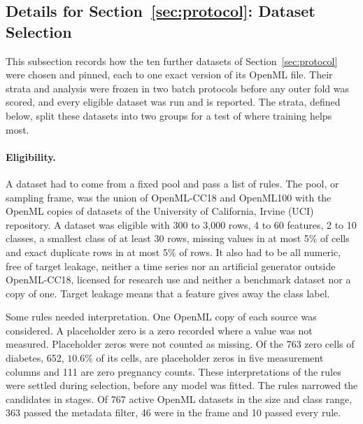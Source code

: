 

\FloatBarrier
\subsection{Details for Section~\ref*{sec:protocol}: Dataset Selection}\label{supp:selection}

This subsection records how the ten further datasets of Section~\ref{sec:protocol} were chosen and pinned, each to one exact version of its OpenML file. Their strata and analysis were frozen in two batch protocols before any outer fold was scored, and every eligible dataset was run and is reported. The strata, defined below, split these datasets into two groups for a test of where training helps most.

\paragraph{Eligibility.} A dataset had to come from a fixed pool and pass a list of rules. The pool, or sampling frame, was the union of OpenML-CC18 and OpenML100 \citep{bischl2021openml} with the OpenML copies of datasets of the University of California, Irvine (UCI) repository. A dataset was eligible with 300 to 3,000 rows, 4 to 60 features, 2 to 10 classes, a smallest class of at least 30 rows, missing values in at most 5\% of cells and exact duplicate rows in at most 5\% of rows. It also had to be all numeric, free of target leakage, neither a time series nor an artificial generator outside OpenML-CC18, licensed for research use and neither a benchmark dataset nor a copy of one. Target leakage means that a feature gives away the class label.

Some rules needed interpretation. One OpenML copy of each source was considered. A placeholder zero is a zero recorded where a value was not measured. Placeholder zeros were not counted as missing. Of the 763 zero cells of diabetes, 652, $10.6\%$ of its cells, are placeholder zeros in five measurement columns and 111 are zero pregnancy counts. These interpretations of the rules were settled during selection, before any model was fitted. The rules narrowed the candidates in stages. Of 767 active OpenML datasets in the size and class range, 363 passed the metadata filter, 46 were in the frame and 10 passed every rule.

